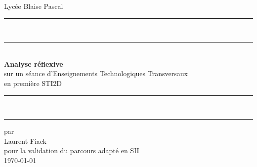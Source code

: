 \begin{titlepage}
\thispagestyle{empty}
\newcommand{\HRule}[2]{\centering\rule{#1}{#2}}

Lycée Blaise Pascal
\vspace{20em}
\begin{center}

	\HRule{\linewidth}{0.5mm}\\
	\vspace{-0.35cm}
	\HRule{\linewidth}{0.3mm}\\
	\textbf{
	\LARGE
	Analyse réflexive\\
	}
	\large
	sur un séance d'Enseignements Technologiques Transversaux\\
	en première STI2D
	\HRule{\linewidth}{0.3mm}\\
	\vspace{-0.45cm}
	\HRule{\linewidth}{0.5mm}

	\vspace{10em}

	par\\
	Laurent Fiack\\

	\vspace{3em}
	pour la validation du parcours adapté en SII\\
	\vspace{3em}
	\today{}

\end{center}

\end{titlepage}    
